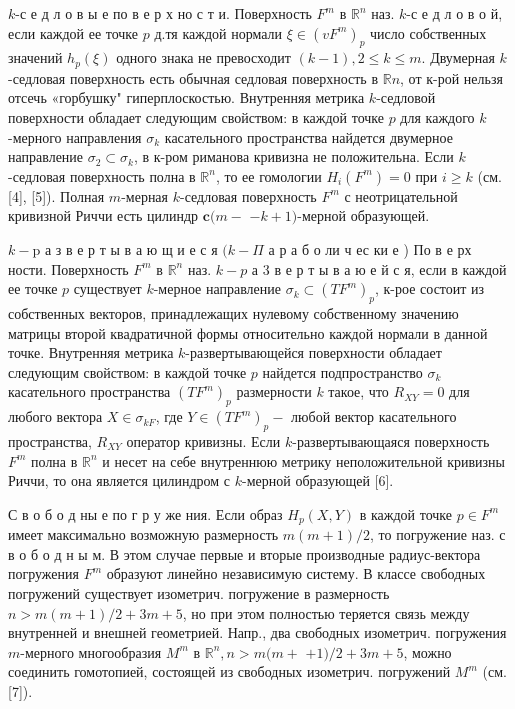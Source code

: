 \documentclass[10pt]{article}
\begin{document}
$k$-с е д л о в ы е по в е р х но с т и. Поверхность $F^{m}$ в $\mathbb{R}^{n}$ наз. $k$-с е д л о в о й, если каждой ее точке $p$ д.тя каждой нормали $\xi \in\left(v F^{m}\right)_{p}$ число собственных значений $h_{p}(\xi)$ одного знака не превосходит $(k-1), 2 \leqslant k \leqslant m$. Двумерная $k$-седловая поверхность есть обычная седловая поверхность в $\mathbb{R} n$, от к-рой нельзя отсечь «горбушку" гиперплоскостью. Внутренняя метрика $k$-седловой поверхности обладает следующим свойством: в каждой точке $p$ для каждого $k$-мерного направления $\sigma_{k}$ касательного пространства найдется двумерное направление $\sigma_{2} \subset \sigma_{k}$, в к-ром риманова кривизна не положительна. Если $k$-седловая поверхность полна в $\mathbb{R}^{n}$, то ее гомологии $H_{i}\left(F^{m}\right)=0$ при $i \geqslant k$ (см.[4], [5]). Полная $m$-мерная $k$-седловая поверхность $F^{m}$ с неотрицательной кривизной Риччи есть цилиндр $\mathbf{c}(m-$ $-k+1)$-мерной образующей.



$k-\mathrm{p}$ а з в е р т ы в а ю щ и е с я $(k-\Pi$ а р а б о ли ч ес ки е ) По в е рх ности. Поверхность $F^{m}$ в $\mathbb{R}^{n}$ наз. $k-p$ а 3 в е р т ы в а ю е й с я, если в каждой ее точке $p$ существует $k$-мерное направление $\sigma_{k} \subset\left(T F^{m}\right)_{p}$, к-рое состоит из собственных векторов, принадлежащих нулевому собственному значению матрицы второй квадратичной формы относительно каждой нормали в данной точке. Внутренняя метрика $k$-развертывающейся поверхности обладает следующим свойством: в каждой точке $p$ найдется подпространство $\sigma_{k}$ касательного пространства $\left(T F^{m}\right)_{p}$ размерности $k$ такое, что $R_{X Y}=0$ для любого вектора $X \in \sigma_{k F}$, где $Y \in\left(T F^{m}\right)_{p}-$ любой вектор касательного пространства, $R_{X Y}$ оператор кривизны. Если $k$-развертывающаяся поверхность $F^{m}$ полна в $\mathbb{R}^{n}$ и несет на себе внутреннюю метрику неположительной кривизны Риччи, то она является цилиндром с $k$-мерной образующей [6].



С в о б о д ны е по г р у же ния. Если образ $H_{p}(X, Y)$ в каждой точке $p \in F^{m}$ имеет максимально возможную размерность $m(m+1) / 2$, то погружение наз. с в о б о д н ы м. В этом случае первые и вторые производные радиус-вектора погружения $F^{m}$ образуют линейно независимую систему. В классе свободных погружений существует изометрич. погружение в размерность $n>m(m+1) / 2+3 m+5$, но при этом полностью теряется связь между внутренней и внешней геометрией. Напр., два свободных изометрич. погружения $m$-мерного многообразия $M^{m}$ в $\mathbb{R}^{n}, n>m(m+$ $+1) / 2+3 m+5$, можно соединить гомотопией, состоящей из свободных изометрич. погружений $M^{m}$ (см. [7]).
\end{document}
